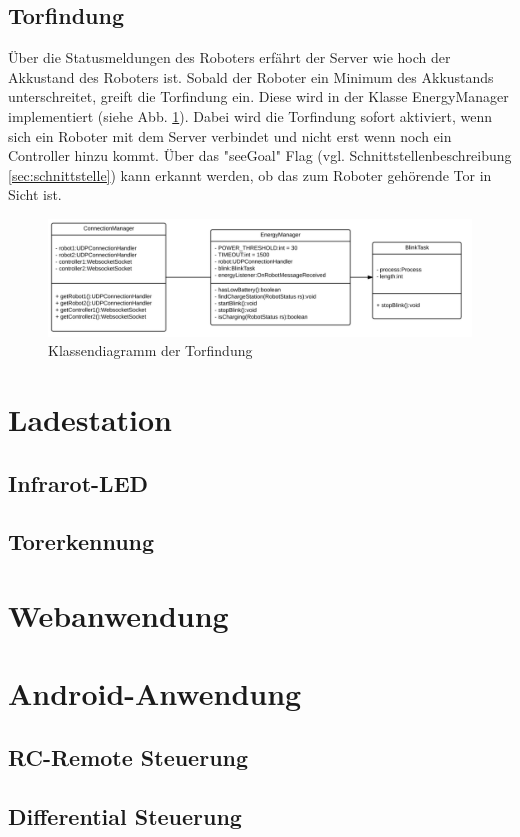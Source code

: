 \subsection{Torfindung}
Über die Statusmeldungen des Roboters erfährt der Server wie hoch der Akkustand des Roboters ist. Sobald der Roboter ein Minimum des Akkustands unterschreitet, greift die Torfindung ein. Diese wird in der Klasse EnergyManager implementiert (siehe Abb. \ref{fig:uml_energymanager}). Dabei wird die Torfindung sofort aktiviert, wenn sich ein Roboter mit dem Server verbindet und nicht erst wenn noch ein Controller hinzu kommt. Über das "seeGoal" Flag (vgl. Schnittstellenbeschreibung \ref{sec:schnittstelle}) kann erkannt werden, ob das zum Roboter gehörende Tor in Sicht ist. 

\begin{figure}[h]
	\includegraphics[width=\textwidth]{images/uml_energymanager.pdf}
	\caption{Klassendiagramm der Torfindung}
	\label{fig:uml_energymanager}
\end{figure}

\section{Ladestation}
\subsection{Infrarot-LED}
\label{sec:infrarot_led}
\subsection{Torerkennung}

\section{Webanwendung}

\section{Android-Anwendung}
\subsection{RC-Remote Steuerung}
\subsection{Differential Steuerung}

